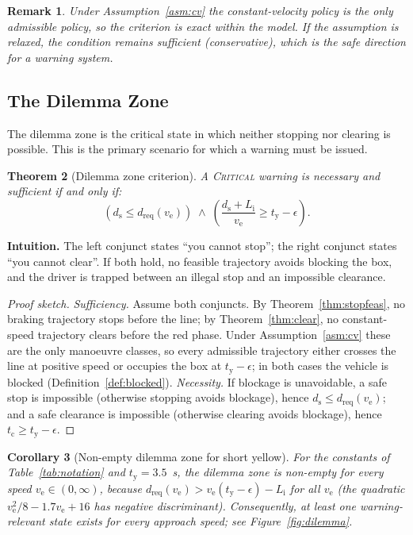 \documentclass[conference, a4paper]{IEEEtran}
\theoremstyle{plain}
\newtheorem{theorem}{Theorem}
\newtheorem{corollary}[theorem]{Corollary}
\newtheorem{remark}[theorem]{Remark}
\newcommand{\dreq}{d_{\mathrm{req}}}
\newcommand{\ds}{d_{\mathrm{s}}}
\newcommand{\tclear}{t_{\mathrm{c}}}
\newcommand{\tred}{t_{\mathrm{y}}}
\newcommand{\Li}{L_{\mathrm{i}}}
\newcommand{\ve}{v_{\mathrm{e}}}
\begin{document}
\begin{remark}
Under Assumption~\ref{asm:cv} the constant-velocity policy is the only
admissible policy, so the criterion is exact within the model. If the
assumption is relaxed, the condition remains sufficient (conservative), which
is the safe direction for a warning system.
\end{remark}

\subsection{The Dilemma Zone}
\label{subsec:dilemma}

The dilemma zone is the critical state in which neither stopping nor clearing
is possible. This is the primary scenario for which a warning must be issued.

\begin{theorem}[Dilemma zone criterion]
\label{thm:dilemma}
A \textsc{Critical} warning is necessary and sufficient if and only if:
\begin{equation}
\left( \ds \leq \dreq(\ve) \right) \;\land\;
\left( \frac{\ds + \Li}{\ve} \geq \tred - \epsilon \right).
\label{eq:dilemma}
\end{equation}
\end{theorem}

\textbf{Intuition.} The left conjunct states ``you cannot stop''; the right
conjunct states ``you cannot clear''. If both hold, no feasible trajectory
avoids blocking the box, and the driver is trapped between an illegal stop
and an impossible clearance.

\begin{proof}[Proof sketch]
\textit{Sufficiency.} Assume both conjuncts. By
Theorem~\ref{thm:stopfeas}, no braking trajectory stops before the line; by
Theorem~\ref{thm:clear}, no constant-speed trajectory clears before the red
phase. Under Assumption~\ref{asm:cv} these are the only manoeuvre classes,
so every admissible trajectory either crosses the line at positive speed or
occupies the box at $\tred - \epsilon$; in both cases the vehicle is blocked
(Definition~\ref{def:blocked}). \textit{Necessity.} If blockage is
unavoidable, a safe stop is impossible (otherwise stopping avoids blockage),
hence $\ds \leq \dreq(\ve)$; and a safe clearance is impossible (otherwise
clearing avoids blockage), hence $\tclear \geq \tred - \epsilon$.
\end{proof}

\begin{corollary}[Non-empty dilemma zone for short yellow]
\label{cor:shortyellow}
For the constants of Table~\ref{tab:notation} and $\tred = 3.5$~s, the
dilemma zone is non-empty for every speed $\ve \in (0, \infty)$, because
$\dreq(\ve) > \ve(\tred - \epsilon) - \Li$ for all $\ve$ (the quadratic
$\ve^2/8 - 1.7\ve + 16$ has negative discriminant). Consequently, at least
one warning-relevant state exists for every approach speed; see
Figure~\ref{fig:dilemma}.
\end{corollary}
\end{document}
